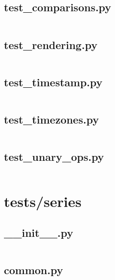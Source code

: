 \documentclass{article}
\begin{document}
\subsection{test\_comparisons.py}
\inputminted{python}{/home/dufferzafar/dev/@clones/pandas/pandas/tests/scalar/timestamp/test_comparisons.py}
\newpage

\subsection{test\_rendering.py}
\inputminted{python}{/home/dufferzafar/dev/@clones/pandas/pandas/tests/scalar/timestamp/test_rendering.py}
\newpage

\subsection{test\_timestamp.py}
\inputminted{python}{/home/dufferzafar/dev/@clones/pandas/pandas/tests/scalar/timestamp/test_timestamp.py}
\newpage

\subsection{test\_timezones.py}
\inputminted{python}{/home/dufferzafar/dev/@clones/pandas/pandas/tests/scalar/timestamp/test_timezones.py}
\newpage

\subsection{test\_unary\_ops.py}
\inputminted{python}{/home/dufferzafar/dev/@clones/pandas/pandas/tests/scalar/timestamp/test_unary_ops.py}
\newpage

\section{tests/series}

\subsection{\_\_init\_\_.py}
\inputminted{python}{/home/dufferzafar/dev/@clones/pandas/pandas/tests/series/__init__.py}
\newpage

\subsection{common.py}
\inputminted{python}{/home/dufferzafar/dev/@clones/pandas/pandas/tests/series/common.py}
\newpage
\end{document}
